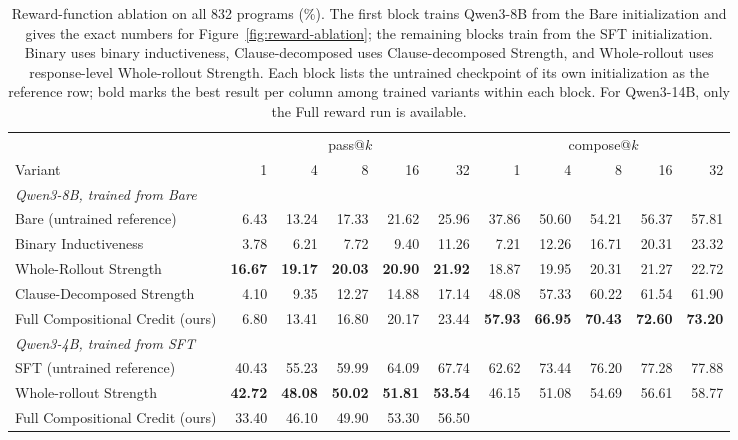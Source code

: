 \begin{table}[H]
\centering
\small
\setlength{\tabcolsep}{2.4pt}
\caption{Reward-function ablation on all 832 programs (\%).  The first block
  trains Qwen3-8B from the Bare initialization and gives the exact numbers for
  Figure~\ref{fig:reward-ablation}; the remaining blocks train from the SFT
  initialization.  Binary uses binary inductiveness, Clause-decomposed uses
  Clause-decomposed Strength, and Whole-rollout uses response-level
  Whole-rollout Strength.  Each block lists the untrained checkpoint of its
  own initialization as the reference row; bold marks the best result per
  column among trained variants within each block.  For Qwen3-14B, only the
  Full reward run is available.}
\label{tab:reward-ablation}
\begin{tabular}{lrrrrrrrrrr}
\toprule
\rowcolor{algobg}
& \multicolumn{5}{c}{pass@\(k\)} & \multicolumn{5}{c}{compose@\(k\)} \\
\headercmidrules{\cmidrule(lr){2-6}\cmidrule(lr){7-11}}
\rowcolor{algobg}
Variant & 1 & 4 & 8 & 16 & 32 & 1 & 4 & 8 & 16 & 32 \\
\midrule
\multicolumn{11}{l}{\textit{Qwen3-8B, trained from Bare}} \\
Bare (untrained reference)
  & 6.43 & 13.24 & 17.33 & 21.62 & 25.96
  & 37.86 & 50.60 & 54.21 & 56.37 & 57.81 \\
Binary Inductiveness
  & 3.78 & 6.21 & 7.72 & 9.40 & 11.26
  & 7.21 & 12.26 & 16.71 & 20.31 & 23.32 \\
Whole-Rollout Strength
  & \textbf{16.67} & \textbf{19.17} & \textbf{20.03} & \textbf{20.90}
  & \textbf{21.92}
  & 18.87 & 19.95 & 20.31 & 21.27 & 22.72 \\
Clause-Decomposed Strength
  & 4.10 & 9.35 & 12.27 & 14.88 & 17.14
  & 48.08 & 57.33 & 60.22 & 61.54 & 61.90 \\
Full Compositional Credit (ours)
  & 6.80 & 13.41 & 16.80 & 20.17 & 23.44
  & \textbf{57.93} & \textbf{66.95} & \textbf{70.43} & \textbf{72.60} & \textbf{73.20} \\
\midrule
\multicolumn{11}{l}{\textit{Qwen3-4B, trained from SFT}} \\
SFT (untrained reference)
  & 40.43 & 55.23 & 59.99 & 64.09 & 67.74
  & 62.62 & 73.44 & 76.20 & 77.28 & 77.88 \\
Whole-rollout Strength
  & \textbf{42.72} & \textbf{48.08} & \textbf{50.02} & \textbf{51.81} & \textbf{53.54}
  & 46.15 & 51.08 & 54.69 & 56.61 & 58.77 \\
Full Compositional Credit (ours)
  & 33.40 & 46.10 & 49.90 & 53.30 & 56.50

\end{tabular}
\end{table}
